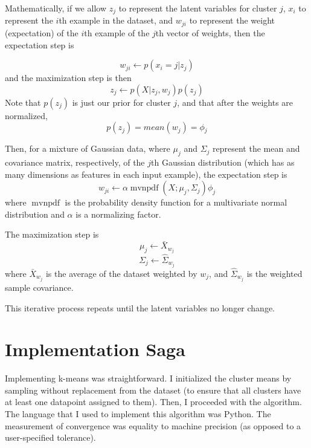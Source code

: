 \documentclass{journal}
\DeclareMathOperator{\mvnpdf}{mvnpdf}
\begin{document}
Mathematically, if we allow $z_{j}$ to represent the latent variables for
cluster $j$, $x_{i}$ to represent the $i$th example in the dataset, and $w_{ji}$
to represent the weight (expectation) of the $i$th example of the $j$th vector
of weights, then the expectation step is

\begin{equation}
    w_{ji} \leftarrow{} p(x_{i} = j|z_{j})
\end{equation}
and the maximization step is then
\begin{equation}
    z_{j} \leftarrow{} p(X|z_{j}, w_{j})p(z_{j})
\end{equation}
Note that $p(z_{j})$ is just our prior for cluster $j$, and that after the
weights are normalized,
$$p(z_{j}) = mean(w_{j}) = \phi{}_{j}$$

Then, for a mixture of Gaussian data, where $\mu_{j}$ and $\Sigma_{j}$ represent
the mean and covariance matrix, respectively, of the $j$th Gaussian distribution
(which has as many dimensions as features in each input example), the
expectation step is
\begin{equation}
    w_{ji} \leftarrow{} \alpha{}\mvnpdf(X; \mu_{j}, \Sigma_{j})\phi_{j}
\end{equation}
where $\mvnpdf{}$ is the probability density function for a multivariate normal
distribution and $\alpha{}$ is a normalizing factor.

The maximization step is
\begin{equation}
    \mu_{j} \leftarrow{} \bar{X}_{w_{j}}
\end{equation}
\begin{equation}
    \Sigma_{j} \leftarrow{} \hat{\Sigma{}}_{w_{j}}
\end{equation}
where $\bar{X}_{w_{j}}$ is the average of the dataset weighted by $w_{j}$, and
$\hat{\Sigma{}}_{w_{j}}$ is the weighted sample covariance.

This iterative process repeats until the latent variables no longer change.


\section{Implementation Saga}
Implementing k-means was straightforward. I initialized the cluster means by
sampling without replacement from the dataset (to ensure that all clusters have
at least one datapoint assigned to them). Then, I proceeded with the algorithm.
The language that I used to implement this algorithm was Python. The measurement
of convergence was equality to machine precision (as opposed to a user-specified
tolerance).
\end{document}
